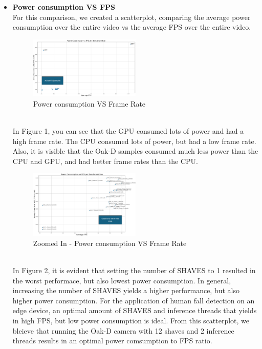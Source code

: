\documentclass[sigconf,authorversion,nonacm]{acmart}
\begin{document}
\begin{itemize}
    \item \textbf{Power consumption VS FPS} \\ For this comparison, we created a scatterplot, comparing the average power consumption over the entire video vs the average FPS over the entire video. 
    \begin{figure}[h] %
        \centering
        \includegraphics[width=0.5\textwidth]{figures/scatter1.png}
        \caption{Power consumption VS Frame Rate}
        \label{fig:your_label}
    \end{figure}
    \\ In Figure 1, you can see that the GPU consumed lots of power and had a high frame rate. The CPU consumed lots of power, but had a low frame rate. Also, it is visible that the Oak-D samples consumed much less power than the CPU and GPU, and had better frame rates than the CPU.
    \begin{figure}[h] %
        \centering
        \includegraphics[width=0.5\textwidth]{figures/scatter2.png}
        \caption{Zoomed In - Power consumption VS Frame Rate}
        \label{fig:your_label}
    \end{figure}
    \\ In Figure 2, it is evident that setting the number of SHAVES to 1 resulted in the worst performace, but also lowest power consumption. In general, increasing the number of SHAVES yields a higher performance, but also higher power consumption. For the application of human fall detection on an edge device, an optimal amount of SHAVES and inference threads that yields in high FPS, but low power consumption is ideal. From this scatterplot, we bleieve that running the Oak-D camera with 12 shaves and 2 inference threads results in an optimal power comsumption to FPS ratio.
    

\end{itemize}
\end{document}

